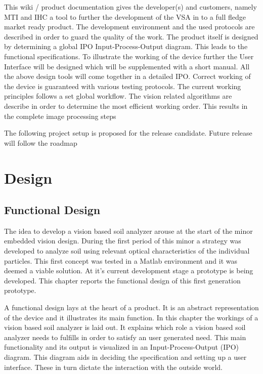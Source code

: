 \documentclass[11pt,fleqn,,a4paper,twoside,openright]{book}
\begin{document}
This wiki / product documentation gives the developer(s) and customers, namely MTI and IHC a tool to further the development of the VSA in to a full fledge market ready product. The development environment and the used protocols are described in order to guard the quality of the work. The product itself is designed by determining a global IPO Input-Process-Output diagram. This leads to the functional specifications. To illustrate the working of the device further the User Interface will be designed which will be supplemented with a short manual. All the above design tools will come together in a detailed IPO. Correct working of the device is guaranteed with various testing protocols. The current working principles follows a set global workflow. The vision related algorithms are describe in order to determine the most efficient working order. This results in the complete image processing steps

The following project setup is proposed for the release candidate. Future release will follow the roadmap

\newpage
\part{Design}

\chapter{Functional Design}
The idea to develop a vision based soil analyzer arouse at the start of the minor embedded vision design. During the first period of this minor a strategy was developed to analyze soil using relevant optical characteristics of the individual particles. This first concept was tested in a Matlab environment and it was deemed a viable solution. At it's current development stage a prototype is being developed. This chapter reports the functional design of this first generation prototype.

A functional design lays at the heart of a product. It is an abstract representation of the device and it illustrates its main function. In this chapter the workings of a vision based soil analyzer is laid out. It explains which role a vision based soil analyzer needs to fulfills in order to satisfy an user generated need. This main functionality and its output is visualized in an Input-Process-Output (IPO) diagram. This diagram aids in deciding the specification and setting up a user interface. These in turn dictate the interaction with the outside world.
\end{document}
